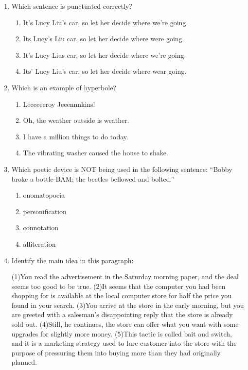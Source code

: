 \documentclass[11pt]{exam}
\begin{document}
\begin{questions}
\begin{enumerate}



\item Which sentence is punctuated correctly?

\begin{enumerate}
\item It's Lucy Liu's car, so let her decide where we're going.
\item Its Lucy's Liu car, so let her decide where were going.
\item It's Lucy Lius car, so let her decide where we're going.
\item Its' Lucy Liu's car, so let her decide where wear going.
\end{enumerate}

\item Which is an example of hyperbole?
\begin{enumerate}
\item Leeeeeeroy Jeeennnkins!
\item Oh, the weather outside is weather.
\item I have a million things to do today.
\item The vibrating washer caused the house to shake.
\end{enumerate}

\item Which poetic device is NOT being used in the following sentence:
  “Bobby broke a bottle-BAM; the beetles bellowed and bolted.”
\begin{enumerate}
\item onomatopoeia
\item personification
\item connotation
\item alliteration
\end{enumerate}

\item Identify the main idea in this paragraph:

(1)You read the advertisement in the Saturday morning paper, and the deal seems too good to be true. (2)It seems that the computer you had been shopping for is available at the local computer store for half the price you found in your search. (3)You arrive at the store in the early morning, but you are greeted with a salesman's disappointing reply that the store is already sold out. (4)Still, he continues, the store can offer what you want with some upgrades for slightly more money. (5)This tactic is called bait and switch, and it is a marketing strategy used to lure customer into the store with the purpose of pressuring them into buying more than they had originally planned.


\end{enumerate}
\end{questions}
\end{document}
